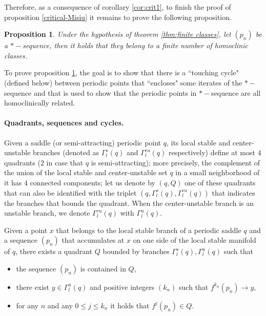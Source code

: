 \documentclass[a4paper,11pt]{article}
\newtheorem{proposition}[lemma]{Proposition}
\theoremstyle{definition}
\def\Ga{\Gamma}
\def\Ga{\Gamma}
\begin{document}
Therefore, as a consequence of  corollary \ref{cor:crit1},  to finish the proof of proposition \ref{critical-Misiu} it remains to prove the following proposition.


\begin{proposition}\label{prop:*-seq} Under the hypothesis of theorem \ref{thm:finite classes}, let $(p_n)$ be a $*-$sequence, then it holds that they belong to a finite number of homoclinic classes.
\end{proposition} 



To prove proposition \ref{prop:*-seq}, the goal is to show that there is a ``touching cycle" (defined below) between  periodic points that ``encloses" some iterates of  the $*-$sequence and that is used to show  that the periodic points in  $*-$sequence are all homoclinically related.

\paragraph{Quadrants, sequences and cycles.} Given a saddle (or semi-attracting) periodic point  $q$, its local  stable and center-unstable branches (denoted as $\Ga_l^s(q)$ and $\Ga^{cu}_l(q)$ respectively) define at most $4$ quadrants ($2$ in case that $q$ is semi-attracting); more precisely, the complement of the union of the local  stable and center-unstable set $q$ in a small neighborhood of it has $4$ connected components; let us denote by $(q,Q)$ one of these quadrants that can also be identified with the triplet $(q, \Gamma^s_l(q), \Gamma^{cu}_l(q))$ that indicates  the branches that bounds the quadrant. When the center-unstable branch is an unstable branch, we denote $\Gamma^{cu}_l(q)$ with $\Ga^u_l(q).$ 

Given a point $x$ that belongs to the local stable branch of a periodic saddle $q$ and a sequence $(p_n)$ that accumulates at $x$ on one side of the local stable manifold  of $q$, there exists a quadrant $Q$ bounded by branches $\Gamma^s_l(q), \Gamma^u_l(q)$ such that 
\begin{itemize}
    \item[--] the sequence $(p_n)$ is contained in $Q$,
    \item[--] there exist $y\in \Gamma^u_l(q)$ and positive integers $(k_n)$ such that $f^{k_n}(p_n)\to y$,
    \item[--] for any $n$ and any  $0\leq j \leq k_n$ it holds that $f^j(p_n)\in Q.$
\end{itemize}
\end{document}
